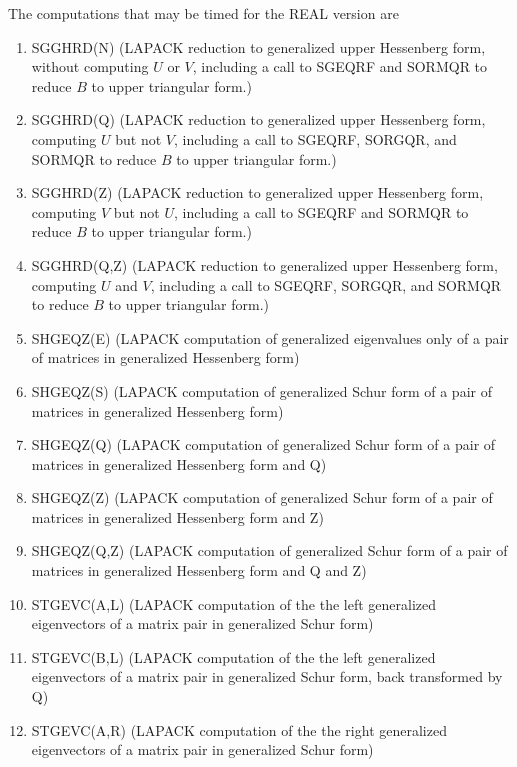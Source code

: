The computations that may be timed for the REAL version are
\begin{enumerate}
\newcommand{\hz}{\hskip0pt{}}
\item SGGHRD(N) (LAPACK reduction to generalized upper Hessenberg form, without
              computing $U$ or $V$, including a call to SGEQRF and SORMQR
              to reduce $B$ to upper triangular form.)
\item SGGHRD(Q) (LAPACK reduction to generalized upper Hessenberg form,
              computing $U$ but not $V$, including a call to SGEQRF, SORGQR,
              and SORMQR to reduce $B$ to upper triangular form.)
\item SGGHRD(Z) (LAPACK reduction to generalized upper Hessenberg form,
              computing $V$ but not $U$, including a call to SGEQRF and SORMQR
              to reduce $B$ to upper triangular form.)
\item SGGHRD(Q,Z) (LAPACK reduction to generalized upper Hessenberg form,
              computing $U$ and $V$, including a call to SGEQRF, SORGQR,
              and SORMQR to reduce $B$ to upper triangular form.)
\item SHGEQZ(E) (LAPACK computation of generalized eigenvalues only of
              a pair of matrices in generalized Hessenberg form)
\item SHGEQZ(S) (LAPACK computation of generalized Schur form of
              a pair of matrices in generalized Hessenberg form)
\item SHGEQZ(Q) (LAPACK computation of generalized Schur form of
              a pair of matrices in generalized Hessenberg form and Q)
\item SHGEQZ(Z) (LAPACK computation of generalized Schur form of
              a pair of matrices in generalized Hessenberg form and Z)
\item SHGEQZ(Q,Z) (LAPACK computation of generalized Schur form of
              a pair of matrices in generalized Hessenberg form and Q and Z)
\item STGEVC(A,L) (LAPACK computation of the the left generalized
              eigenvectors of a matrix pair in generalized Schur form)
\item STGEVC(B,L) (LAPACK computation of the the left generalized
              eigenvectors of a matrix pair in generalized Schur form, back
              transformed by Q)
\item STGEVC(A,R) (LAPACK computation of the the right generalized
              eigenvectors of a matrix pair in generalized Schur form)

\end{enumerate}
